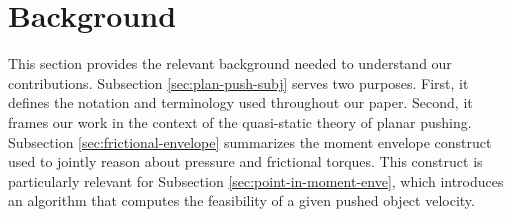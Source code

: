 \documentclass[conference]{IEEEtran}
\newcommand{\BB}[1]{{\color{red} {Byron: {#1}}}}
\begin{document}









\section{Background}\label{sec:background}
This section provides the relevant background needed to understand our
contributions. Subsection \ref{sec:plan-push-subj} serves two
purposes. First, it defines the notation and terminology used
throughout our paper. Second, it frames our work in the context of the
quasi-static theory of planar pushing. Subsection
\ref{sec:frictional-envelope} summarizes the moment envelope construct
used to jointly reason about pressure and frictional torques. This
construct is particularly relevant for Subsection
\ref{sec:point-in-moment-enve}, which introduces an algorithm that
computes the feasibility of a given pushed object velocity.
\end{document}
